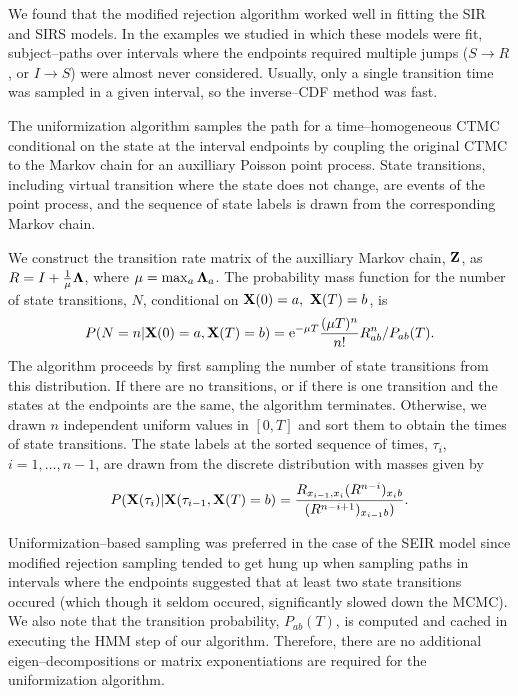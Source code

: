We found that the modified rejection algorithm worked well in fitting the SIR and SIRS models. In the examples we studied in which these models were fit, subject--paths over intervals where the endpoints required multiple jumps ($ S \rightarrow R $, or $ I \rightarrow S $) were almost never considered. Usually, only a single transition time was sampled in a given interval, so the inverse--CDF method was fast.

The uniformization algorithm samples the path for a time--homogeneous CTMC conditional on the state at the interval endpoints by coupling the original CTMC to the Markov chain for an auxilliary Poisson point process. State transitions, including virtual transition where the state does not change, are events of the point process, and the sequence of state labels is drawn from the corresponding Markov chain.

We construct the transition rate matrix of the auxilliary Markov chain, $ \mathbf{Z} $, as $ R = I + \frac{1}{\mu}\boldsymbol{\Lambda} $, where $ \mu = \max_a \boldsymbol{\Lambda}_a$. The probability mass function for the number of state transitions, $ N $, conditional on $ \mathbf{X}(0) = a,\ \mathbf{X}(T) = b $, is
\begin{equation}
P(N=n|\mathbf{X}(0) = a, \mathbf{X}(T) = b) = \mathrm{e}^{-\mu T}\frac{(\mu T)^n}{n!}R_{ab}^n / P_{ab}(T).
\end{equation}
The algorithm proceeds by first sampling the number of state transitions from this distribution. If there are no transitions, or if there is one transition and the states at the endpoints are the same, the algorithm terminates. Otherwise, we drawn $ n $ independent uniform values in $ [0,T] $ and sort them to obtain the times of state transitions. The state labels at the sorted sequence of times, $ \tau_i $, $ i = 1,\dots,n-1 $, are drawn from the discrete distribution with masses given by
\begin{equation}
P(\mathbf{X}(\tau_i) | \mathbf{X}(\tau_{i-1}, \mathbf{X}(T) = b) = \frac{R_{x_{i-1},x_i}(R^{n-i})_{x_ib}}{(R^{n-i+1})_{x_{i-1}b})}.
\end{equation}

Uniformization--based sampling was preferred in the case of the SEIR model since modified rejection sampling tended to get hung up when sampling paths in intervals where the endpoints suggested that at least two state transitions occured (which though it seldom occured, significantly slowed down the MCMC). We also note that the transition probability, $ P_{ab}(T) $, is computed and cached in executing the HMM step of our algorithm. Therefore, there are no additional eigen--decompositions or matrix exponentiations are required for the uniformization algorithm.

